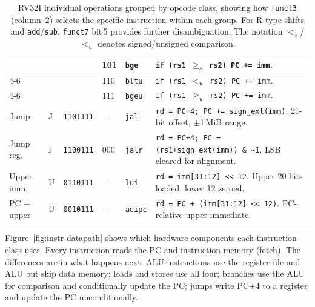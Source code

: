 \documentclass[9pt, a4paper]{extarticle}
\begin{document}
\begin{table}[htbp]
{\begin{tabular}{@{} l | l | l | l | l | p{9cm} @{}}
    & & & 101 & \texttt{bge} &
        \texttt{if (rs1 $\geq_s$ rs2) PC += imm}. \\ \cline{4-6}
    & & & 110 & \texttt{bltu} &
        \texttt{if (rs1 $<_u$ rs2) PC += imm}. \\ \cline{4-6}
    & & & 111 & \texttt{bgeu} &
        \texttt{if (rs1 $\geq_u$ rs2) PC += imm}. \\
    \midrule
    Jump & J & \texttt{1101111} & --- & \texttt{jal}    & \texttt{rd = PC+4; PC += sign\_ext(imm)}. 21-bit offset, $\pm$1\,MiB range. \\
    \midrule
    Jump reg. & I & \texttt{1100111} & 000 & \texttt{jalr}   & \texttt{rd = PC+4; PC = (rs1+sign\_ext(imm)) \& \~{}1}. LSB cleared for alignment. \\
    \midrule
    Upper imm. & U & \texttt{0110111} & --- & \texttt{lui}    & \texttt{rd = imm[31:12] << 12}. Upper 20 bits loaded, lower 12 zeroed. \\
    \midrule
    PC + upper & U & \texttt{0010111} & --- & \texttt{auipc}  & \texttt{rd = PC + (imm[31:12] << 12)}. PC-relative upper immediate. \\
    \bottomrule
\end{tabular}}
\caption{RV32I individual operations grouped by opcode class, showing how \texttt{funct3} (column~2) selects the specific instruction within each group. For R-type shifts and \texttt{add}/\texttt{sub}, \texttt{funct7} bit\,5 provides further disambiguation. The notation $<_s$/$<_u$ denotes signed/unsigned comparison.}
\label{tab:rv32-ops-grouped}
\end{table}

Figure~\ref{fig:instr-datapath} shows which hardware components each instruction class uses. Every instruction reads the PC and instruction memory (fetch). The differences are in what happens next: ALU instructions use the register file and ALU but skip data memory; loads and stores use all four; branches use the ALU for comparison and conditionally update the PC; jumps write PC+4 to a register and update the PC unconditionally.
\end{document}
